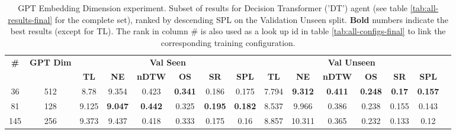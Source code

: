 \begin{table}
\centering
\caption{\label{tab:dt_dim_test}GPT Embedding Dimension experiment. Subset of results for Decision Transformer ('DT') agent (see table \ref{tab:all-results-final} for the complete set), ranked by descending SPL on the Validation Unseen split. \textbf{Bold} numbers indicate the best results (except for TL). The rank in column \# is also used as a look up id in table \ref{tab:all-configs-final} to link the corresponding training configuration.}
\begin{tabular}{@{\hskip3pt}c@{\hskip3pt}c@{\hskip3pt}c@{\hskip3pt}c@{\hskip3pt}c@{\hskip3pt}c@{\hskip3pt}c@{\hskip3pt}c@{\hskip3pt}c@{\hskip3pt}c@{\hskip3pt}c@{\hskip3pt}c@{\hskip3pt}c@{\hskip3pt}c@{\hskip3pt}c}
\toprule
                                  \textbf{\#} & \textbf{GPT Dim} & \multicolumn{6}{c}{\textbf{Val Seen}} & \multicolumn{6}{c}{\textbf{Val Unseen}} \\
\cmidrule(l){3-8}\cmidrule(l){9-14}\textbf{~} &       \textbf{~} &       \textbf{TL} &     \textbf{NE} &   \textbf{nDTW} &     \textbf{OS} &     \textbf{SR} &    \textbf{SPL} &         \textbf{TL} &     \textbf{NE} &   \textbf{nDTW} &     \textbf{OS} &    \textbf{SR} &    \textbf{SPL} \\
\midrule
                                           36 &              512 &              8.78 &           9.354 &           0.423 &  \textbf{0.341} &           0.186 &           0.175 &               7.794 &  \textbf{9.312} &  \textbf{0.411} &  \textbf{0.248} &  \textbf{0.17} &  \textbf{0.157} \\
                                           81 &              128 &             9.125 &  \textbf{9.047} &  \textbf{0.442} &           0.325 &  \textbf{0.195} &  \textbf{0.182} &               8.537 &           9.966 &           0.386 &           0.238 &          0.155 &           0.143 \\
                                          145 &              256 &             9.373 &           9.437 &           0.418 &           0.333 &           0.175 &            0.16 &               8.857 &          10.311 &           0.365 &           0.232 &          0.133 &            0.12 \\
\bottomrule
\end{tabular}
\end{table}
